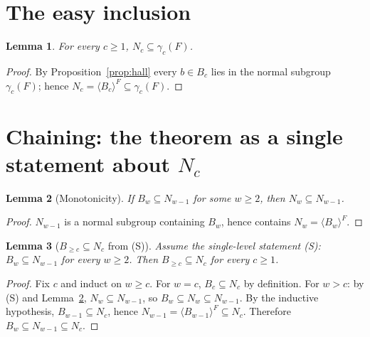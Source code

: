 \documentclass{amsart}
\newtheorem{lemma}{Lemma}
\theoremstyle{definition}
\theoremstyle{remark}
\begin{document}
\section{The easy inclusion}\label{sec:easy}

\begin{lemma}\label{lem:easy}
For every $c\ge1$, $N_c\subseteq\gamma_c(F)$.
\end{lemma}
\begin{proof}
By Proposition~\ref{prop:hall} every $b\in B_c$ lies in the normal subgroup
$\gamma_c(F)$; hence $N_c=\langle B_c\rangle^{F}\subseteq\gamma_c(F)$.
\end{proof}

\section{Chaining: the theorem as a single statement about $N_c$}\label{sec:chain}

\begin{lemma}[Monotonicity]\label{lem:mono}
If $B_w\subseteq N_{w-1}$ for some $w\ge2$, then $N_w\subseteq N_{w-1}$.
\end{lemma}
\begin{proof}
$N_{w-1}$ is a normal subgroup containing $B_w$, hence contains
$N_w=\langle B_w\rangle^{F}$.
\end{proof}

\begin{lemma}[$B_{\ge c}\subseteq N_c$ from (S)]\label{lem:Bgec}
Assume the single-level statement \textup{(S)}: $B_w\subseteq N_{w-1}$ for every
$w\ge2$. Then $B_{\ge c}\subseteq N_c$ for every $c\ge1$.
\end{lemma}
\begin{proof}
Fix $c$ and induct on $w\ge c$. For $w=c$, $B_c\subseteq N_c$ by definition. For
$w>c$: by (S) and Lemma~\ref{lem:mono}, $N_w\subseteq N_{w-1}$, so
$B_w\subseteq N_w\subseteq N_{w-1}$. By the inductive hypothesis,
$B_{w-1}\subseteq N_c$, hence $N_{w-1}=\langle B_{w-1}\rangle^{F}\subseteq N_c$.
Therefore $B_w\subseteq N_{w-1}\subseteq N_c$.
\end{proof}
\end{document}
